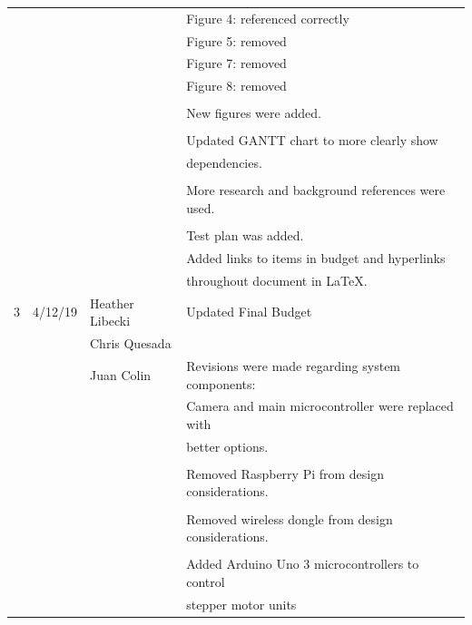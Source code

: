 \begin{table} [H]
\begin{tabular}{|l|l|l|l|}
	      &			 &				   & Figure 4: referenced correctly\\
	      &          		 &                			   & Figure 5: removed\\
	      &			 &				   & Figure 7: removed\\
	      &			 &				   & Figure 8: removed\\
	      &			 &				   &	\\
	      &			 & 				   & New figures were added.\\
	      &			 &				   &	\\
	      &			 &				   & Updated GANTT chart to more clearly show\\
	      &			 &				   & dependencies.\\
	      &			 &				   &	\\
	      &			 &				   & More research and background references were used.\\
	      &			 &				   &	\\
	      &			 &				   & Test plan was added.\\
 	      &			 &				   & Added links to items in budget and hyperlinks \\
 	      &          		 &                 			   & throughout document in LaTeX.\\
 	     	 \hline
 	   3 & 4/12/19  	 & Heather Libecki & Updated Final Budget \\ 
 	      &          		 & Chris Quesada  	 	   & 	\\
 	      &			 & Juan Colin     		   & Revisions were made regarding system components: \\ 
 	      &			 &                 			   & Camera and main microcontroller were replaced with \\
 	      &			 &				   & better options. 	\\
 	      &          		 &               			   & 	\\
 	      &          		 &              			   & Removed Raspberry Pi from design considerations. \\
 	      &         		 &               			   & 	\\
 	      &         		 &             			   & Removed wireless dongle from design considerations. \\
 	      &        		 &              			   & \\
 	      &         		 &            		              & Added Arduino Uno 3 microcontrollers to control \\
 	      &        		 &                			   & stepper motor units \\

\end{tabular}
\end{table}
